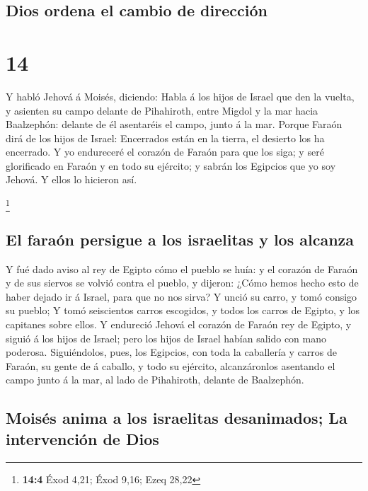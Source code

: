 \hypertarget{dios-ordena-el-cambio-de-direcciuxf3n}{%
\subsection{Dios ordena el cambio de
dirección}\label{dios-ordena-el-cambio-de-direcciuxf3n}}

\hypertarget{section-13}{%
\section{14}\label{section-13}}

 Y habló Jehová á Moisés, diciendo:  Habla á
los hijos de Israel que den la vuelta, y asienten su campo delante de
Pihahiroth, entre Migdol y la mar hacia Baalzephón: delante de él
asentaréis el campo, junto á la mar.  Porque Faraón dirá
de los hijos de Israel: Encerrados están en la tierra, el desierto los
ha encerrado.  Y yo endureceré el corazón de Faraón para
que los siga; y seré glorificado en Faraón y en todo su ejército; y
sabrán los Egipcios que yo soy Jehová. Y ellos lo hicieron así.

\footnote{\textbf{14:4} Éxod 4,21; Éxod 9,16; Ezeq 28,22}

\hypertarget{el-farauxf3n-persigue-a-los-israelitas-y-los-alcanza}{%
\subsection{El faraón persigue a los israelitas y los
alcanza}\label{el-farauxf3n-persigue-a-los-israelitas-y-los-alcanza}}

 Y fué dado aviso al rey de Egipto cómo el pueblo se huía:
y el corazón de Faraón y de sus siervos se volvió contra el pueblo, y
dijeron: ¿Cómo hemos hecho esto de haber dejado ir á Israel, para que no
nos sirva?  Y unció su carro, y tomó consigo su pueblo;
 Y tomó seiscientos carros escogidos, y todos los carros
de Egipto, y los capitanes sobre ellos.  Y endureció
Jehová el corazón de Faraón rey de Egipto, y siguió á los hijos de
Israel; pero los hijos de Israel habían salido con mano poderosa.
 Siguiéndolos, pues, los Egipcios, con toda la caballería
y carros de Faraón, su gente de á caballo, y todo su ejército,
alcanzáronlos asentando el campo junto á la mar, al lado de Pihahiroth,
delante de Baalzephón.

\hypertarget{moisuxe9s-anima-a-los-israelitas-desanimados-la-intervenciuxf3n-de-dios}{%
\subsection{Moisés anima a los israelitas desanimados; La intervención
de
Dios}\label{moisuxe9s-anima-a-los-israelitas-desanimados-la-intervenciuxf3n-de-dios}}

